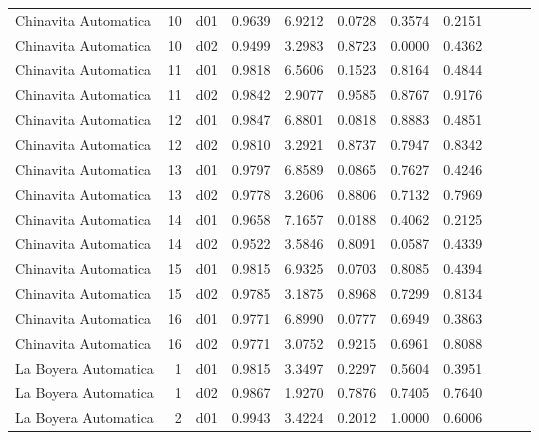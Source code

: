 \begin{landscape}
\begin{longtable}{p{2cm}rrrrrrrrrr}
 Chinavita Automatica  &         10 &     d01 &   0.9639 &  6.9212 &        0.0728 &           0.3574 &  0.2151 \\
 Chinavita Automatica  &         10 &     d02 &   0.9499 &  3.2983 &        0.8723 &           0.0000 &  0.4362 \\
 Chinavita Automatica  &         11 &     d01 &   0.9818 &  6.5606 &        0.1523 &           0.8164 &  0.4844 \\
 Chinavita Automatica  &         11 &     d02 &   0.9842 &  2.9077 &        0.9585 &           0.8767 &  0.9176 \\
 Chinavita Automatica  &         12 &     d01 &   0.9847 &  6.8801 &        0.0818 &           0.8883 &  0.4851 \\
 Chinavita Automatica  &         12 &     d02 &   0.9810 &  3.2921 &        0.8737 &           0.7947 &  0.8342 \\
 Chinavita Automatica  &         13 &     d01 &   0.9797 &  6.8589 &        0.0865 &           0.7627 &  0.4246 \\
 Chinavita Automatica  &         13 &     d02 &   0.9778 &  3.2606 &        0.8806 &           0.7132 &  0.7969 \\
 Chinavita Automatica  &         14 &     d01 &   0.9658 &  7.1657 &        0.0188 &           0.4062 &  0.2125 \\
 Chinavita Automatica  &         14 &     d02 &   0.9522 &  3.5846 &        0.8091 &           0.0587 &  0.4339 \\
 Chinavita Automatica  &         15 &     d01 &   0.9815 &  6.9325 &        0.0703 &           0.8085 &  0.4394 \\
 Chinavita Automatica  &         15 &     d02 &   0.9785 &  3.1875 &        0.8968 &           0.7299 &  0.8134 \\
 Chinavita Automatica  &         16 &     d01 &   0.9771 &  6.8990 &        0.0777 &           0.6949 &  0.3863 \\
 Chinavita Automatica  &         16 &     d02 &   0.9771 &  3.0752 &        0.9215 &           0.6961 &  0.8088 \\
 La Boyera Automatica  &          1 &     d01 &   0.9815 &  3.3497 &        0.2297 &           0.5604 &  0.3951 \\
 La Boyera Automatica  &          1 &     d02 &   0.9867 &  1.9270 &        0.7876 &           0.7405 &  0.7640 \\
 La Boyera Automatica  &          2 &     d01 &   0.9943 &  3.4224 &        0.2012 &           1.0000 &  0.6006 \\

\end{longtable}
\end{landscape}
